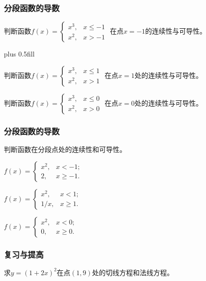 \documentclass[14pt,notheorems,leqno,xcolor={rgb}]{beamer} %
\begin{document}
\begin{frame}
\frametitle{分段函数的导数}
\vspace{-0.6em}%
\begin{example}
判断函数$f(x)=\begin{cases}x^3, & x\le-1 \\x^2, & x>-1\end{cases}$
在点$x=-1$的连续性与可导性。\cdotfill{}
\end{example}
\vskip 0pt plus 0.5fill
\begin{example}
判断函数$f(x)=\begin{cases}x^3, & x\le1 \\x^2, & x>1\end{cases}$
在点$x=1$处的连续性与可导性。\pause\cdotfill{}
\end{example}
\vpause
\begin{example}
判断函数$f(x)=\begin{cases}x^3, & x\le0 \\x^2, & x>0\end{cases}$
在点$x=0$处的连续性与可导性。\pause\cdotfill{}
\end{example}
\end{frame}

\begin{oframe}
\frametitle{分段函数的导数}
\begin{exercise}
判断函数在分段点处的连续性和可导性。
\begin{enumlite}
  \item $f(x)=\begin{cases}x^2, & x<-1; \\ 2  , & x\ge-1.\end{cases}$
  \item $f(x)=\begin{cases}x^2, & x<1;  \\ 1/x, & x\ge1.\end{cases}$
  \item $f(x)=\begin{cases}x^2, & x<0;  \\ 0  , & x\ge0.\end{cases}$
\end{enumlite}
\end{exercise}
\end{oframe}


\begin{oframe}
\frametitle{复习与提高}
\begin{review}
求$y=(1+2x)^2$在点$(1,9)$处的切线方程和法线方程。
\end{review}
\end{oframe}
\end{document}
